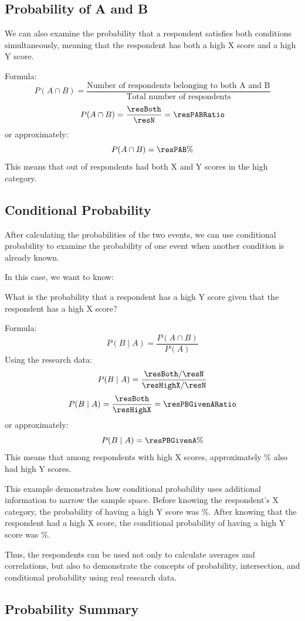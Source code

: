 \subsection{Probability of A and B}

We can also examine the probability that a respondent satisfies both
conditions simultaneously, meaning that the respondent has both a high X
score and a high Y score.

Formula:
\[
P(A \cap B) = \frac{\text{Number of respondents belonging to both A and B}}{\text{Total number of respondents}}
\]
\[
P(A \cap B) = \frac{\resBoth}{\resN} = \resPABRatio
\]
or approximately:
\[
P(A \cap B) = \resPAB\%
\]
This means that \resBoth{} out of \resN{} respondents had both X and Y
scores in the high category.

\subsection{Conditional Probability}

After calculating the probabilities of the two events, we can use
conditional probability to examine the probability of one event when
another condition is already known.

In this case, we want to know:

What is the probability that a respondent has a high Y score given that
the respondent has a high X score?

Formula:
\[
P(B \mid A) = \frac{P(A \cap B)}{P(A)}
\]
Using the research data:
\[
P(B \mid A) = \frac{\resBoth/\resN}{\resHighX/\resN}
\]
\[
P(B \mid A) = \frac{\resBoth}{\resHighX} = \resPBGivenARatio
\]
or approximately:
\[
P(B \mid A) = \resPBGivenA\%
\]
This means that among respondents with high X scores, approximately
\resPBGivenA\% also had high Y scores.

This example demonstrates how conditional probability uses additional
information to narrow the sample space. Before knowing the respondent's X
category, the probability of having a high Y score was \resPB\%. After
knowing that the respondent had a high X score, the conditional
probability of having a high Y score was \resPBGivenA\%.

Thus, the \resN{} respondents can be used not only to calculate averages
and
correlations, but also to demonstrate the concepts of probability,
intersection, and conditional probability using real research data.

\subsection{Probability Summary}

